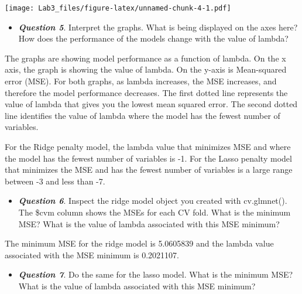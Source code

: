 \documentclass[
]{article}
\newenvironment{Shaded}{\begin{snugshade}}{\end{snugshade}}
\newcommand{\CommentTok}[1]{\textcolor[rgb]{0.56,0.35,0.01}{\textit{#1}}}
\newcommand{\FunctionTok}[1]{\textcolor[rgb]{0.13,0.29,0.53}{\textbf{#1}}}
\newcommand{\NormalTok}[1]{#1}
\newcommand{\OtherTok}[1]{\textcolor[rgb]{0.56,0.35,0.01}{#1}}
\newcommand{\SpecialCharTok}[1]{\textcolor[rgb]{0.81,0.36,0.00}{\textbf{#1}}}
\providecommand{\tightlist}{%
  \setlength{\itemsep}{0pt}\setlength{\parskip}{0pt}}
\begin{document}
\texttt{[image: Lab3\_files/figure-latex/unnamed-chunk-4-1.pdf]}

\begin{itemize}
\tightlist
\item
  \textbf{\emph{Question 5}}. Interpret the graphs. What is being
  displayed on the axes here? How does the performance of the models
  change with the value of lambda?
\end{itemize}

The graphs are showing model performance as a function of lambda. On the
x axis, the graph is showing the value of lambda. On the y-axis is
Mean-squared error (MSE). For both graphs, as lambda increases, the MSE
increases, and therefore the model performance decreases. The first
dotted line represents the value of lambda that gives you the lowest
mean squared error. The second dotted line identifies the value of
lambda where the model has the fewest number of variables.

For the Ridge penalty model, the lambda value that minimizes MSE and
where the model has the fewest number of variables is -1. For the Lasso
penalty model that minimizes the MSE and has the fewest number of
variables is a large range between -3 and less than -7.

\begin{itemize}
\tightlist
\item
  \textbf{\emph{Question 6}}. Inspect the ridge model object you created
  with cv.glmnet(). The \$cvm column shows the MSEs for each CV fold.
  What is the minimum MSE? What is the value of lambda associated with
  this MSE minimum?
\end{itemize}

\begin{Shaded}
\end{Shaded}

The minimum MSE for the ridge model is 5.0605839 and the lambda value
associated with the MSE minimum is 0.2021107.

\begin{itemize}
\tightlist
\item
  \textbf{\emph{Question 7}}. Do the same for the lasso model. What is
  the minimum MSE? What is the value of lambda associated with this MSE
  minimum?
\end{itemize}
\end{document}
